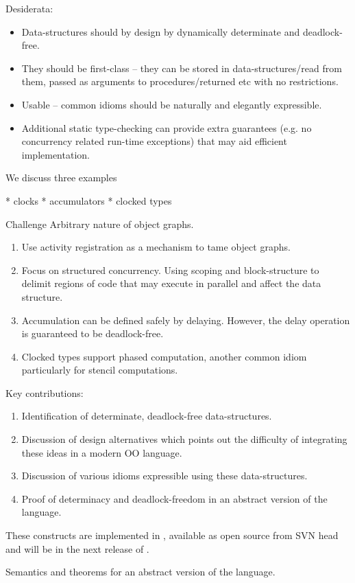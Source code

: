 
Desiderata:

\begin{itemize}
\item Data-structures should by design by dynamically determinate and
   deadlock-free.
\item They should be first-class -- they can be stored in
  data-structures/read from them, passed as arguments to
  procedures/returned etc with no restrictions. 
\item Usable -- common idioms should be naturally and elegantly expressible.
\item Additional static type-checking can provide extra guarantees
  (e.g.{} no concurrency related run-time exceptions) that may aid
  efficient implementation.
\end{itemize}

We discuss three examples

  * clocks
  * accumulators
  * clocked types

Challenge
  Arbitrary nature of object graphs.


{\em 
\begin{enumerate}
\item Use activity registration as a mechanism to tame object graphs.
\item Focus on structured concurrency. Using scoping and block-structure
    to delimit regions of code that may execute in parallel and affect
    the data structure.

\item Accumulation can be defined safely by delaying. However, the delay
    operation is guaranteed to be deadlock-free.

\item Clocked types support phased computation, another common idiom
    particularly for stencil computations.
\end{enumerate}
}

Key contributions:
{\em 
\begin{enumerate}
\item Identification of determinate, deadlock-free data-structures. 
\item Discussion of design alternatives which points out the
  difficulty of integrating these ideas in a modern OO language.
\item Discussion of various idioms expressible using these data-structures.
\item Proof of determinacy and deadlock-freedom in an abstract version
  of the language.
\end{enumerate}
These constructs are implemented in \Xten, available as open source from
SVN head and will be in the next release of \Xten.
}


Semantics and theorems for an abstract version of the language.

